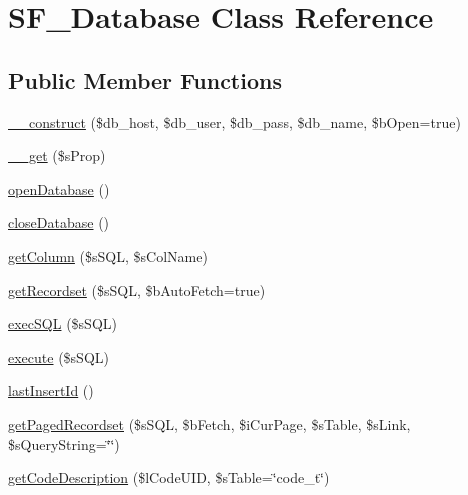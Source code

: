 \hypertarget{classSF__Database}{
\section{SF\_\-Database Class Reference}
\label{classSF__Database}
}
\subsection*{Public Member Functions}
\begin{DoxyCompactItemize}
\item 
\hyperlink{classSF__Database_a3c340f556311885a446b78d09fe251fe}{\_\-\_\-construct} (\$db\_\-host, \$db\_\-user, \$db\_\-pass, \$db\_\-name, \$bOpen=true)
\item 
\hyperlink{classSF__Database_a9519b5bba407a1a89f324fcc7f26c0e2}{\_\-\_\-get} (\$sProp)
\item 
\hyperlink{classSF__Database_a9dc5da61781d3ffe5bc80275a129d08a}{openDatabase} ()
\item 
\hyperlink{classSF__Database_a758f42d99646ba28d9f7e1e98e7c53aa}{closeDatabase} ()
\item 
\hyperlink{classSF__Database_a42aa90065617eb50272b78b6cb6fc204}{getColumn} (\$sSQL, \$sColName)
\item 
\hyperlink{classSF__Database_afe9f39bb0724efbb1bfce415adf58944}{getRecordset} (\$sSQL, \$bAutoFetch=true)
\item 
\hyperlink{classSF__Database_a81c4a9c9c1c23b0bd6e72aaa79e06cf1}{execSQL} (\$sSQL)
\item 
\hyperlink{classSF__Database_a566d5b96d7daf38fa67aec957c86d28f}{execute} (\$sSQL)
\item 
\hyperlink{classSF__Database_a6384591ddfa09e979deb8a695bca0f67}{lastInsertId} ()
\item 
\hyperlink{classSF__Database_a38916f407b1f86fc9d67ae4eb1b8b98b}{getPagedRecordset} (\$sSQL, \$bFetch, \$iCurPage, \$sTable, \$sLink, \$sQueryString=\char`\"{}\char`\"{})
\item 
\hyperlink{classSF__Database_a6773cb271409c3c3d9439a5bb1132b7b}{getCodeDescription} (\$lCodeUID, \$sTable=\char`\"{}code\_\-t\char`\"{})
\end{DoxyCompactItemize}
